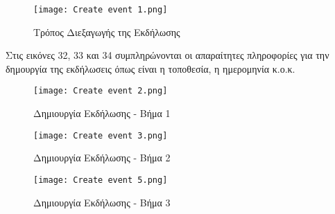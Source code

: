 \documentclass{article}
\begin{document}
\vspace{0.3cm}

\begin{figure}[!htb]
\centering
\texttt{[image: Create event 1.png]} 
\caption{\label{fig: event1} Τρόπος Διεξαγωγής της Εκδήλωσης}
\end{figure}

\newpage

\par Στις εικόνες 32, 33 και 34 συμπληρώνονται οι απαραίτητες πληροφορίες για την δημουργία της εκδήλωσεις όπως είναι η τοποθεσία, η ημερομηνία κ.ο.κ.

\begin{figure}[!htb]
\centering
\texttt{[image: Create event 2.png]} 
\caption{\label{fig: event2} Δημιουργία Εκδήλωσης - Βήμα 1}
\end{figure}

\vspace{0.3cm}

\begin{figure}[!htb]
\centering
\texttt{[image: Create event 3.png]} 
\caption{\label{fig: event3} Δημιουργία Εκδήλωσης - Βήμα 2}
\end{figure}

\vspace{0.3cm}

\begin{figure}[!htb]
\centering
\texttt{[image: Create event 5.png]} 
\caption{\label{fig: event4} Δημιουργία Εκδήλωσης - Βήμα 3}
\end{figure}
\end{document}
